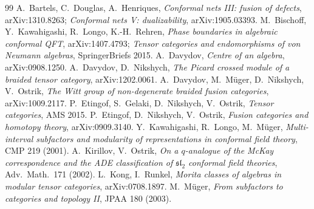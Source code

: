 \documentclass[11pt]{article}
\theoremstyle{definition}
\theoremstyle{remark}
\begin{document}
\begin{thebibliography}{99}\small
{} A.~Bartels, C.~Douglas, A.~Henriques, \emph{Conformal nets III: fusion of defects}, arXiv:1310.8263; \emph{Conformal nets V: dualizability}, arXiv:1905.03393.
 M.~Bischoff, Y.~Kawahigashi, R.~Longo, K.-H.~Rehren, \emph{Phase boundaries in algebraic conformal QFT}, arXiv:1407.4793; \emph{Tensor categories and endomorphisms of von Neumann algebras}, SpringerBriefs 2015.
 A.~Davydov, \emph{Centre of an algebra}, arXiv:0908.1250.
 A.~Davydov, D.~Nikshych, \emph{The Picard crossed module of a braided tensor category}, arXiv:1202.0061.
 A.~Davydov, M.~M\"uger, D.~Nikshych, V.~Ostrik, \emph{The Witt group of non-degenerate braided fusion categories}, arXiv:1009.2117.
 P.~Etingof, S.~Gelaki, D.~Nikshych, V.~Ostrik, \emph{Tensor categories}, AMS 2015.
 P.~Etingof, D.~Nikshych, V.~Ostrik, \emph{Fusion categories and homotopy theory}, arXiv:0909.3140.
 Y.~Kawahigashi, R.~Longo, M.~M\"uger, \emph{Multi-interval subfactors and modularity of representations in conformal field theory}, CMP 219 (2001).
 A.~Kirillov, V.~Ostrik, \emph{On a $q$-analogue of the McKay correspondence and the ADE classification of $\mathfrak{sl}_2$ conformal field theories}, Adv.\ Math.\ 171 (2002).
 L.~Kong, I.~Runkel, \emph{Morita classes of algebras in modular tensor categories}, arXiv:0708.1897.
 M.~M\"uger, \emph{From subfactors to categories and topology II}, JPAA 180 (2003).
\end{thebibliography}
\end{document}
